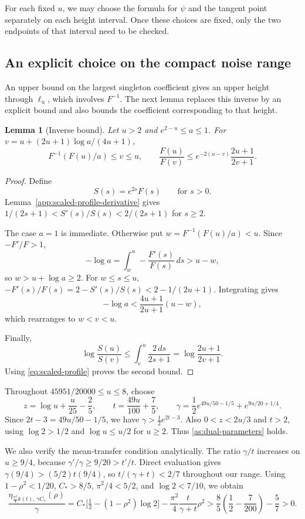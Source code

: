 \documentclass[11pt,letterpaper]{amsart}
\newcommand{\1}{\mathbf 1}
\newtheorem{lemma}[theorem]{Lemma}
\numberwithin{equation}{section}
\begin{document}
For each fixed $u$, we may choose the formula for $\psi$ and
the tangent point separately on each height interval.
Once these choices are fixed, only the two endpoints of that
interval need to be checked.

\subsection{An explicit choice on the compact noise range}
\label{sec:compact-spectral}

An upper bound on the largest singleton coefficient gives an
upper height through $\ell_u$, which involves $F^{-1}$.
The next lemma replaces this inverse by an explicit bound
and also bounds the coefficient corresponding to that height.

\begin{lemma}[Inverse bound]\label{as:explicit-inverse}
Let $u>2$ and $e^{2-u}\le a\le1$.
For $v=u+(2u+1)\log a/(4u+1)$,
\[
 F^{-1}(F(u)/a)\le v\le u,
 \qquad
 \frac{F(u)}{F(v)}
 \le e^{-2(u-v)}\frac{2u+1}{2v+1}.
\]
\end{lemma}

\begin{proof}
Define
\begin{equation}\label{eq:scaled-profile}
 S(s)=e^{2s}F(s)\qquad \text{for } s>0.
\end{equation}
Lemma~\ref{app:scaled-profile-derivative} gives
$1/(2s+1)<S'(s)/S(s)<2/(2s+1)$ for $s\ge2$.

The case $a=1$ is immediate.
Otherwise put $w=F^{-1}(F(u)/a)<u$.
Since $-F'/F>1$,
\[
 -\log a=\int_w^u-\frac{F'(s)}{F(s)}\,ds>u-w,
\]
so $w>u+\log a\ge2$.
For $w\le s\le u$,
$-F'(s)/F(s)=2-S'(s)/S(s)<2-1/(2u+1)$.
Integrating gives
\[
 -\log a<
 \frac{4u+1}{2u+1}(u-w),
\]
which rearranges to $w<v<u$.

Finally,
\[
 \log\frac{S(u)}{S(v)}
 \le\int_v^u\frac{2\,ds}{2s+1}
 =\log\frac{2u+1}{2v+1}.
\]
Using \eqref{eq:scaled-profile} proves the second bound.
\end{proof}

Throughout $45951/20000\le u\le8$, choose
\[
 z=\log u+\frac{u}{25}-\frac25,
 \qquad
 t=\frac{49u}{100}+\frac75,
 \qquad
 \gamma=\frac12e^{49u/50-1/5}+e^{9u/20+1/4}.
\]
Since $2t-3=49u/50-1/5$, we have
$\gamma>\frac12e^{2t-3}$.
Also $0<z<2u/3$ and $t>2$, using
$\log2>1/2$ and $\log u\le u/2$ for $u\ge2$.
Thus \eqref{as:dual-parameters} holds.

We also verify the mean-transfer condition analytically.
The ratio $\gamma/t$ increases on $u\ge9/4$, because
$\gamma'/\gamma\ge9/20>t'/t$.
Direct evaluation gives
$\gamma(9/4)>(5/2)t(9/4)$, so
$t/(\gamma+t)<2/7$ throughout our range.
Using $1-\rho^2<1/20$, $C_*>8/5$,
$\pi^2/4<5/2$, and $\log2<7/10$, we obtain
\[
 \frac{\eta_{\frac{\pi^2}{4}k(t),\,\gamma C_*}(\rho)}{\gamma}
 =C_*\bigl[\tfrac12-(1-\rho^2)\log2\bigr]
   -\frac{\pi^2}{4}\frac{t}{\gamma+t}\rho^2>\frac85\left(\frac12-\frac7{200}\right)-\frac57>0.
\]
\end{document}

